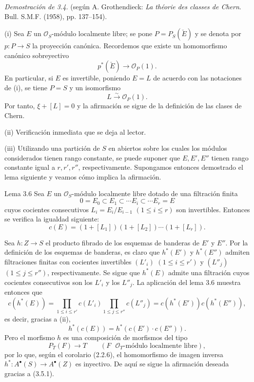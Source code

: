 \emph{Demostración de 3.4.} (según A. Grothendieck: \emph{La théorie des classes de Chern}. Bull. S.M.F. (1958), pp. 137--154).

(i) Sea $E$ un $\mathcal O_S$-módulo localmente libre; se pone $P=P_S(\check E)$ y se denota por $p:P\to S$ la proyección canónica. Recordemos que existe un homomorfismo canónico sobreyectivo
\[
p^*(\check E)\longrightarrow \mathcal O_P(1).
\]
En particular, si $E$ es invertible, poniendo $E=L$ de acuerdo con las notaciones de (i), se tiene $P=S$ y un isomorfismo
\[
L\xrightarrow{\sim}\mathcal O_P(1).
\]
Por tanto, $\xi+[L]=0$ y la afirmación se sigue de la definición de las clases de Chern.

(ii) Verificación inmediata que se deja al lector.

(iii) Utilizando una partición de $S$ en abiertos sobre los cuales los módulos considerados tienen rango constante, se puede suponer que $E,E',E''$ tienen rango constante igual a $r,r',r''$, respectivamente. Supongamos entonces demostrado el lema siguiente y veamos cómo implica la afirmación.

\begin{statement}{Lema 3.6}
Sea $E$ un $\mathcal O_S$-módulo localmente libre dotado de una filtración finita
\[
0=E_0\subset E_1\subset\cdots E_i\subset\cdots E_r=E
\]
cuyos cocientes consecutivos $L_i=E_i/E_{i-1}$ $(1\le i\le r)$ son invertibles. Entonces se verifica la igualdad siguiente:
\[
c(E)=(1+[L_1])(1+[L_2])\cdots(1+[L_r]).
\]
\end{statement}

Sea $h:Z\to S$ el producto fibrado de los esquemas de banderas de $E'$ y $E''$. Por la definición de los esquemas de banderas, es claro que $h^*(E')$ y $h^*(E'')$ admiten filtraciones finitas con cocientes invertibles $(L'_i)$ $(1\le i\le r')$ y $(L''_j)$ $(1\le j\le r'')$, respectivamente. Se sigue que $h^*(E)$ admite una filtración cuyos cocientes consecutivos son los $L'_i$ y los $L''_j$. La aplicación del lema 3.6 muestra entonces que
\[
c(h^*(E))=
\prod_{1\le i\le r'}c(L'_i)\prod_{1\le j\le r''}c(L''_j)
=c(h^*(E'))c(h^*(E'')),
\]
es decir, gracias a (ii),
\[
h^*(c(E))=h^*(c(E')\cdot c(E'')).
\tag{3.5.1}
\]
Pero el morfismo $h$ es una composición de morfismos del tipo
\[
P_T(F)\longrightarrow T
\qquad (F\text{ }\mathcal O_T\text{-módulo localmente libre}),
\]
por lo que, según el corolario (2.2.6), el homomorfismo de imagen inversa $h^*:A^{\bullet}(S)\to A^{\bullet}(Z)$ es inyectivo. De aquí se sigue la afirmación deseada gracias a (3.5.1).
